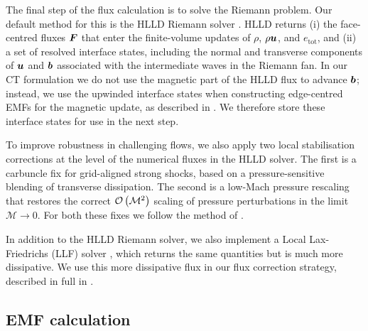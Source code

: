 The final step of the flux calculation is to solve the Riemann problem. Our default method for this is the HLLD Riemann solver \citep{Miyoshi05a}. HLLD returns (i) the face-centred fluxes $\bm{F}$ that enter the finite-volume updates of $\rho$, $\rho\bm{u}$, and $e_\mathrm{tot}$, and (ii) a set of resolved interface states, including the normal and transverse components of $\bm{u}$ and $\bm{b}$ associated with the intermediate waves in the Riemann fan. In our CT formulation we do not use the magnetic part of the HLLD flux to advance $\bm{b}$; instead, we use the upwinded interface states when constructing edge-centred EMFs for the magnetic update, as described in . We therefore store these interface states for use in the next step.

To improve robustness in challenging flows, we also apply two local stabilisation corrections at the level of the numerical fluxes in the HLLD solver. The first is a carbuncle fix for grid-aligned strong shocks, based on a pressure-sensitive blending of transverse dissipation. The second is a low-Mach pressure rescaling that restores the correct $\mathcal{O}\left( \mathcal{M}^2 \right)$ scaling of pressure perturbations in the limit $\mathcal{M} \rightarrow 0$. For both these fixes we follow the method of \citet{Minoshima21a}.

In addition to the HLLD Riemann solver, we also implement a Local Lax-Friedrichs (LLF) solver \citep{Rusanov62a}, which returns the same quantities but is much more dissipative. We use this more dissipative flux in our flux correction strategy, described in full in .

\subsection{EMF calculation}
\label{sec:methods:emf}

